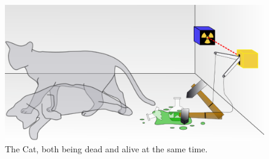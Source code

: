 \documentclass[11pt]{article}
\begin{document}
\begin{figure}[]
	\centering
	\includegraphics[scale = .3] {cat.png}
	\caption{The Cat, both being dead and alive at the same time. }
\end{figure}
\clearpage
\end{document}
